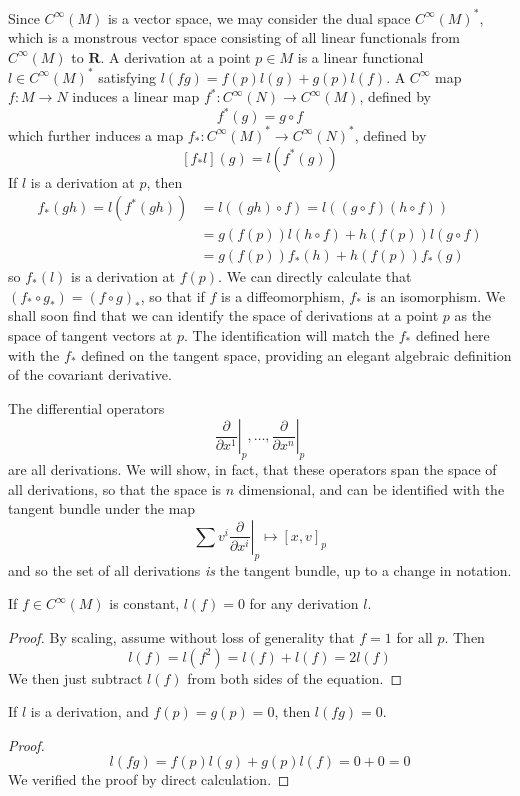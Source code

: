 Since $C^\infty(M)$ is a vector space, we may consider the dual space $C^\infty(M)^*$, which is a monstrous vector space consisting of all linear functionals from $C^\infty(M)$ to $\mathbf{R}$. A derivation at a point $p \in M$ is a linear functional $l \in C^\infty(M)^*$ satisfying $l(fg) = f(p) l(g) + g(p) l(f)$. A $C^\infty$ map $f: M \to N$ induces a linear map $f^*: C^\infty(N) \to C^\infty(M)$, defined by
%
\[ f^*(g) = g \circ f \]
%
which further induces a map $f_*: C^\infty(M)^* \to C^\infty(N)^*$, defined by
%
\[ [f_*l](g) = l(f^*(g)) \]
%
If $l$ is a derivation at $p$, then
%
\begin{align*}
    f_*(gh) = l(f^*(gh)) &= l((gh) \circ f) = l((g \circ f)(h \circ f))\\
    &= g(f(p)) l(h \circ f) + h(f(p)) l(g \circ f)\\
    &= g(f(p)) f_*(h) + h(f(p)) f_*(g)
\end{align*}
%
so $f_*(l)$ is a derivation at $f(p)$. We can directly calculate that $(f_* \circ g_*) = (f \circ g)_*$, so that if $f$ is a diffeomorphism, $f_*$ is an isomorphism. We shall soon find that we can identify the space of derivations at a point $p$ as the space of tangent vectors at $p$. The identification will match the $f_*$ defined here with the $f_*$ defined on the tangent space, providing an elegant algebraic definition of the covariant derivative.

The differential operators
%
\[ \left. \frac{\partial}{\partial x^1} \right|_p, \dots, \left. \frac{\partial}{\partial x^n}\right|_p \]
%
are all derivations. We will show, in fact, that these operators span the space of all derivations, so that the space is $n$ dimensional, and can be identified with the tangent bundle under the map
%
\[ \left. \sum v^i \frac{\partial}{\partial x^i} \right|_p \mapsto [x,v]_p \]
%
and so the set of all derivations {\it is} the tangent bundle, up to a change in notation.

\begin{lemma}
    If $f \in C^\infty(M)$ is constant, $l(f) = 0$ for any derivation $l$.
\end{lemma}
\begin{proof}
    By scaling, assume without loss of generality that $f = 1$ for all $p$. Then
    \[ l(f) = l(f^2) = l(f) + l(f) = 2 l(f) \]
    We then just subtract $l(f)$ from both sides of the equation.
\end{proof}

\begin{lemma}
    If $l$ is a derivation, and $f(p) = g(p) = 0$, then $l(fg) = 0$.
\end{lemma}
\begin{proof}
    \[ l(fg) = f(p) l(g) + g(p) l(f) = 0 + 0 = 0 \]
    We verified the proof by direct calculation.
\end{proof}

